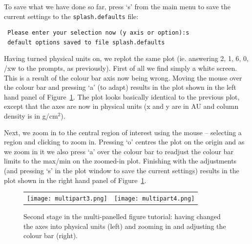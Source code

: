 \documentclass[a4paper,11pt]{article}
\begin{document}
 To save what we have done so far, press `s' from the main menu to save the current settings to the \verb+splash.defaults+ file:
\begin{verbatim}
 Please enter your selection now (y axis or option):s
 default options saved to file splash.defaults
\end{verbatim}

 Having turned physical units on, we replot the same plot (ie. answering 2, 1, 6, 0, /xw to the prompts, as previously). First of all we find simply a white screen. This is a result of the colour bar axis now being wrong. Moving the mouse over the colour bar and pressing `a' (to adapt) results in the plot shown in the left hand panel of Figure~\ref{fig:multipart3}. The plot looks basically identical to the previous plot, except that the axes are now in physical units (x and y are in AU and column density is in g/cm$^{2}$). 

Next, we zoom in to the central region of interest using the mouse -- selecting a region and clicking to zoom in. Pressing `o' centres the plot on the origin and as we zoom in it we also press `a' over the colour bar to readjust the colour bar limits to the max/min on the zoomed-in plot. Finishing with the adjustments (and pressing `s' in the plot window to save the current settings) results in the plot shown in the right hand panel of Figure~\ref{fig:multipart3}.
\begin{figure}[h]
\begin{center}
\begin{tabular}{cc}
\texttt{[image: multipart3.png]} &
\texttt{[image: multipart4.png]}
\end{tabular}
\caption{Second stage in the multi-panelled figure tutorial: having changed the axes into physical units (left) and zooming in and adjusting the colour bar (right).}
\label{fig:multipart3}
\end{center}
\end{figure}
\end{document}
